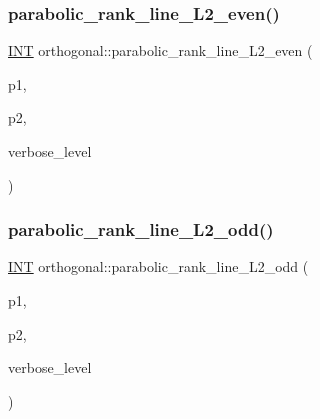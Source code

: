 \subsubsection{\texorpdfstring{parabolic\+\_\+rank\+\_\+line\+\_\+\+L2\+\_\+even()}{parabolic\_rank\_line\_L2\_even()}}
{\footnotesize\ttfamily \mbox{\hyperlink{galois_8h_a09fddde158a3a20bd2dcadb609de11dc}{I\+NT}} orthogonal\+::parabolic\+\_\+rank\+\_\+line\+\_\+\+L2\+\_\+even (\begin{DoxyParamCaption}\item[{\mbox{\hyperlink{galois_8h_a09fddde158a3a20bd2dcadb609de11dc}{I\+NT}}}]{p1,  }\item[{\mbox{\hyperlink{galois_8h_a09fddde158a3a20bd2dcadb609de11dc}{I\+NT}}}]{p2,  }\item[{\mbox{\hyperlink{galois_8h_a09fddde158a3a20bd2dcadb609de11dc}{I\+NT}}}]{verbose\+\_\+level }\end{DoxyParamCaption})}

\mbox{\label{classorthogonal_a87ddd814e99966b82e69a1041307074f}} 
\subsubsection{\texorpdfstring{parabolic\+\_\+rank\+\_\+line\+\_\+\+L2\+\_\+odd()}{parabolic\_rank\_line\_L2\_odd()}}
{\footnotesize\ttfamily \mbox{\hyperlink{galois_8h_a09fddde158a3a20bd2dcadb609de11dc}{I\+NT}} orthogonal\+::parabolic\+\_\+rank\+\_\+line\+\_\+\+L2\+\_\+odd (\begin{DoxyParamCaption}\item[{\mbox{\hyperlink{galois_8h_a09fddde158a3a20bd2dcadb609de11dc}{I\+NT}}}]{p1,  }\item[{\mbox{\hyperlink{galois_8h_a09fddde158a3a20bd2dcadb609de11dc}{I\+NT}}}]{p2,  }\item[{\mbox{\hyperlink{galois_8h_a09fddde158a3a20bd2dcadb609de11dc}{I\+NT}}}]{verbose\+\_\+level }\end{DoxyParamCaption})}

\mbox{\label{classorthogonal_afea1a02e2b439b28127cfa2a782da8c9}} 
